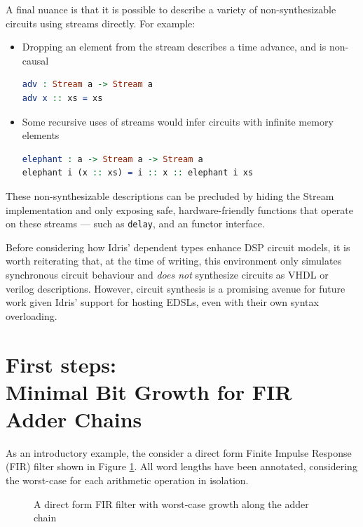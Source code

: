 \documentclass[conference]{IEEEtran}
\begin{document}
A final nuance is that it is possible to describe a variety of non-synthesizable
circuits using streams directly. For example:

\begin{itemize}
\item Dropping an element from the stream describes a time advance, and is
  non-causal
\begin{lstlisting}[language=idris]
adv : Stream a -> Stream a
adv x :: xs = xs
\end{lstlisting}
      
\item Some recursive uses of streams would infer circuits with infinite memory
  elements\cite{baaij_15}
\begin{lstlisting}[language=idris]
elephant : a -> Stream a -> Stream a
elephant i (x :: xs) = i :: x :: elephant i xs
\end{lstlisting}
\end{itemize}

These non-synthesizable descriptions can be precluded by hiding the Stream
implementation and only exposing safe, hardware-friendly functions that operate
on these streams --- such as \texttt{delay}, and an functor interface.

Before considering how Idris' dependent types enhance DSP circuit models, it is
worth reiterating that, at the time of writing, this environment only simulates
synchronous circuit behaviour and \emph{does not} synthesize circuits as VHDL or
verilog descriptions. However, circuit synthesis is a promising avenue for
future work given Idris' support for hosting EDSLs, even with their own syntax
overloading\cite{brady_12}.


\section{First steps:\\Minimal Bit Growth for FIR Adder Chains}
\label{sec:fir}

As an introductory example, the consider a direct form Finite Impulse Response
(FIR) filter shown in Figure \ref{fig:fir_direct}. All word lengths have been
annotated, considering the worst-case for each arithmetic operation in
isolation. 

\begin{figure}
  \centering
  
  \caption{A direct form FIR filter with worst-case growth along the adder chain}
  \label{fig:fir_direct}
\end{figure}
\end{document}
